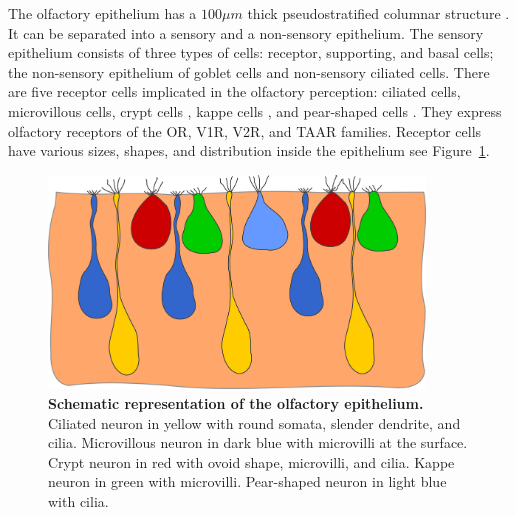     The olfactory epithelium has a $100\mu m$ thick pseudostratified columnar structure \cite{hara2012fish}. It can be separated into a sensory and a non-sensory epithelium. The sensory epithelium consists of three types of cells: receptor, supporting, and basal cells; the non-sensory epithelium of goblet cells and non-sensory ciliated cells. There are five receptor cells implicated in the olfactory perception: ciliated cells, microvillous cells, crypt cells \cite{ichikawa1977fine,hansen2005diversity}, kappe cells \cite{ahuja2014kappe}, and pear-shaped cells \cite{wakisaka2017adenosine}. They express olfactory receptors of the OR, V1R, V2R, and TAAR families. Receptor cells have various sizes, shapes, and distribution inside the epithelium see Figure~\ref{olfactory_schematic_full}.

    \begin{figure}[h]
      \centering
      \includegraphics[width=10cm]{part_2/assets/olfactory_schematic_full.png}
      \caption{{\bf Schematic representation of the olfactory epithelium.} Ciliated neuron in yellow with round somata, slender dendrite, and cilia. Microvillous neuron in dark blue with microvilli at the surface. Crypt neuron in red with ovoid shape, microvilli, and cilia. Kappe neuron in green with microvilli. Pear-shaped neuron in light blue with cilia.}
      \label{olfactory_schematic_full}
    \end{figure}

